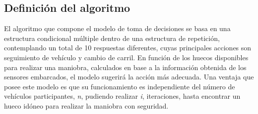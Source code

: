 \subsection{Definición del algoritmo}\label{522}
El algoritmo que compone el modelo de toma de decisiones se basa en una estructura condicional múltiple dentro de una estructura de repetición, contemplando un total de 10 respuestas diferentes, cuyas principales acciones son seguimiento de vehículo y cambio de carril. En función de los huecos disponibles para realizar una maniobra, calculados en base a la información obtenida de los sensores embarcados, el modelo sugerirá la acción más adecuada. Una ventaja que posee este modelo es que su funcionamiento es independiente del número de vehículos participantes, \emph{n}, pudiendo realizar \emph{i}, iteraciones, hasta encontrar un hueco idóneo para realizar la maniobra con seguridad.  

